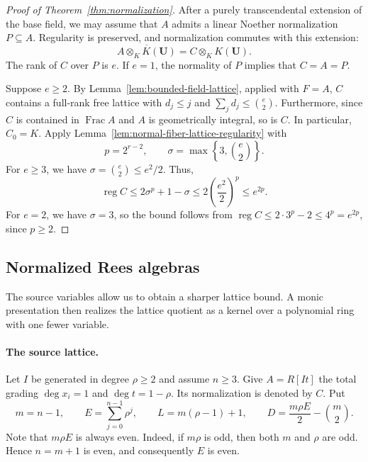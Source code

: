 \documentclass[12pt]{amsart}
\numberwithin{equation}{section}
\theoremstyle{definition}
\theoremstyle{remark}
\numberwithin{equation}{section}
\DeclareMathOperator{\reg}{reg}
\begin{document}
\begin{proof}[Proof of Theorem~\ref{thm:normalization}]
After a purely transcendental extension of the base field, we may assume that $A$ admits a linear Noether normalization $P\subseteq A$.
Regularity is preserved, and normalization commutes with this extension:
\[
 \overline{A\otimes_KK(\mathbf U)}=C\otimes_KK(\mathbf U).
\]
The rank of $C$ over $P$ is $e$. If $e=1$, the normality of $P$ implies that $C=A=P$.

Suppose $e\ge2$. By Lemma~\ref{lem:bounded-field-lattice}, applied with $F=A$, $C$ contains a full-rank free lattice with $d_j\le j$ and $\sum_jd_j\le\binom e2$.
Furthermore, since $C$ is contained in $\operatorname{Frac}A$ and $A$ is geometrically integral, so is $C$. In particular,
 $C_0=K$.
Apply Lemma~\ref{lem:normal-fiber-lattice-regularity} with
\[
 p=2^{r-2},\qquad \sigma=\max\left\{3,\binom e2\right\}.
\]
For $e\ge3$, we have $\sigma=\binom e2\le e^2/2$. Thus,
\[
 \reg C\le2\sigma^p+1-\sigma
 \le2\left(\frac{e^2}{2}\right)^p
 \le e^{2p}.
\]
For $e=2$, we have $\sigma = 3$, so the bound follows from $\reg C\le2\cdot3^p-2\le  4^p = e^{2p}$, since $p\ge2$.
\end{proof}

\subsection{Normalized Rees algebras}
\label{subsec:rees-regularity}
The source variables allow us to obtain a sharper lattice bound. A monic presentation then realizes the lattice quotient as a kernel over a polynomial ring with one fewer variable.

\paragraph{\textbf{The source lattice.}}

Let $I$ be generated in degree $\rho\ge2$  and assume $n\ge3$. Give $A=R[It]$ the total grading $\deg x_i=1$ and $\deg t=1-\rho$. Its normalization is denoted by $C$.
Put
\begin{equation}\label{eq:source-constants}
 m=n-1,\qquad E=\sum_{j=0}^{n-1}\rho^j,\qquad
 L=m(\rho-1)+1,\qquad
 D=\frac{m\rho E}{2}-\binom m2.
\end{equation}
Note that $m\rho E$ is always even. Indeed, if $m\rho$ is odd, then both $m$ and $\rho$ are odd. Hence $n=m+1$ is even, and consequently $E$ is even.
\end{document}
